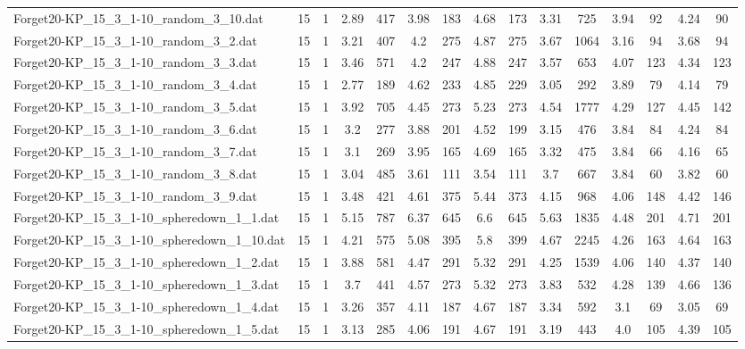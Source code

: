 \begin{table}[!ht]
{\begin{tabular}{lcccccccccccccc}
Forget20-KP\_15\_3\_1-10\_random\_3\_10.dat & 15 & 1 & 2.89 & 417 & 3.98 & 183 & 4.68 & 173 & 3.31 & 725 & 3.94 & 92 & 4.24 & 90 \\
Forget20-KP\_15\_3\_1-10\_random\_3\_2.dat & 15 & 1 & 3.21 & 407 & 4.2 & 275 & 4.87 & 275 & 3.67 & 1064 & 3.16 & 94 & 3.68 & 94 \\
Forget20-KP\_15\_3\_1-10\_random\_3\_3.dat & 15 & 1 & 3.46 & 571 & 4.2 & 247 & 4.88 & 247 & 3.57 & 653 & 4.07 & 123 & 4.34 & 123 \\
Forget20-KP\_15\_3\_1-10\_random\_3\_4.dat & 15 & 1 & 2.77 & 189 & 4.62 & 233 & 4.85 & 229 & 3.05 & 292 & 3.89 & 79 & 4.14 & 79 \\
Forget20-KP\_15\_3\_1-10\_random\_3\_5.dat & 15 & 1 & 3.92 & 705 & 4.45 & 273 & 5.23 & 273 & 4.54 & 1777 & 4.29 & 127 & 4.45 & 142 \\
Forget20-KP\_15\_3\_1-10\_random\_3\_6.dat & 15 & 1 & 3.2 & 277 & 3.88 & 201 & 4.52 & 199 & 3.15 & 476 & 3.84 & 84 & 4.24 & 84 \\
Forget20-KP\_15\_3\_1-10\_random\_3\_7.dat & 15 & 1 & 3.1 & 269 & 3.95 & 165 & 4.69 & 165 & 3.32 & 475 & 3.84 & 66 & 4.16 & 65 \\
Forget20-KP\_15\_3\_1-10\_random\_3\_8.dat & 15 & 1 & 3.04 & 485 & 3.61 & 111 & 3.54 & 111 & 3.7 & 667 & 3.84 & 60 & 3.82 & 60 \\
Forget20-KP\_15\_3\_1-10\_random\_3\_9.dat & 15 & 1 & 3.48 & 421 & 4.61 & 375 & 5.44 & 373 & 4.15 & 968 & 4.06 & 148 & 4.42 & 146 \\
Forget20-KP\_15\_3\_1-10\_spheredown\_1\_1.dat & 15 & 1 & 5.15 & 787 & 6.37 & 645 & 6.6 & 645 & 5.63 & 1835 & 4.48 & 201 & 4.71 & 201 \\
Forget20-KP\_15\_3\_1-10\_spheredown\_1\_10.dat & 15 & 1 & 4.21 & 575 & 5.08 & 395 & 5.8 & 399 & 4.67 & 2245 & 4.26 & 163 & 4.64 & 163 \\
Forget20-KP\_15\_3\_1-10\_spheredown\_1\_2.dat & 15 & 1 & 3.88 & 581 & 4.47 & 291 & 5.32 & 291 & 4.25 & 1539 & 4.06 & 140 & 4.37 & 140 \\
Forget20-KP\_15\_3\_1-10\_spheredown\_1\_3.dat & 15 & 1 & 3.7 & 441 & 4.57 & 273 & 5.32 & 273 & 3.83 & 532 & 4.28 & 139 & 4.66 & 136 \\
Forget20-KP\_15\_3\_1-10\_spheredown\_1\_4.dat & 15 & 1 & 3.26 & 357 & 4.11 & 187 & 4.67 & 187 & 3.34 & 592 & 3.1 & 69 & 3.05 & 69 \\
Forget20-KP\_15\_3\_1-10\_spheredown\_1\_5.dat & 15 & 1 & 3.13 & 285 & 4.06 & 191 & 4.67 & 191 & 3.19 & 443 & 4.0 & 105 & 4.39 & 105 \\

\end{tabular}}
\end{table}
